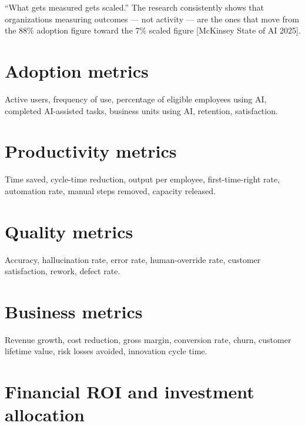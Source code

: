 
``What gets measured gets scaled.'' The research consistently shows that
organizations measuring outcomes — not activity — are the ones that move from
the 88\% adoption figure toward the 7\% scaled figure [McKinsey State of AI
2025].

\section{Adoption metrics}
Active users, frequency of use, percentage of eligible employees using AI,
completed AI-assisted tasks, business units using AI, retention, satisfaction.

\section{Productivity metrics}
Time saved, cycle-time reduction, output per employee, first-time-right rate,
automation rate, manual steps removed, capacity released.

\section{Quality metrics}
Accuracy, hallucination rate, error rate, human-override rate, customer
satisfaction, rework, defect rate.

\section{Business metrics}
Revenue growth, cost reduction, gross margin, conversion rate, churn, customer
lifetime value, risk losses avoided, innovation cycle time.

\section{Financial ROI and investment allocation}

